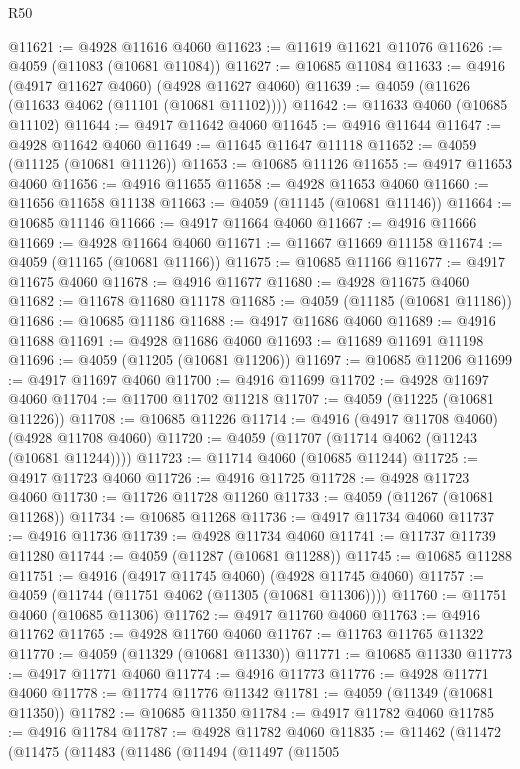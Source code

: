 \begin{lexlean}{R50}
\begin{coremodule}
@11621 := @4928 @11616 @4060
@11623 := @11619 @11621 @11076
@11626 := @4059 (@11083 (@10681 @11084))
@11627 := @10685 @11084
@11633 := @4916 (@4917 @11627 @4060) (@4928 @11627 @4060)
@11639 := @4059 (@11626 (@11633 @4062 (@11101 (@10681 @11102))))
@11642 := @11633 @4060 (@10685 @11102)
@11644 := @4917 @11642 @4060
@11645 := @4916 @11644
@11647 := @4928 @11642 @4060
@11649 := @11645 @11647 @11118
@11652 := @4059 (@11125 (@10681 @11126))
@11653 := @10685 @11126
@11655 := @4917 @11653 @4060
@11656 := @4916 @11655
@11658 := @4928 @11653 @4060
@11660 := @11656 @11658 @11138
@11663 := @4059 (@11145 (@10681 @11146))
@11664 := @10685 @11146
@11666 := @4917 @11664 @4060
@11667 := @4916 @11666
@11669 := @4928 @11664 @4060
@11671 := @11667 @11669 @11158
@11674 := @4059 (@11165 (@10681 @11166))
@11675 := @10685 @11166
@11677 := @4917 @11675 @4060
@11678 := @4916 @11677
@11680 := @4928 @11675 @4060
@11682 := @11678 @11680 @11178
@11685 := @4059 (@11185 (@10681 @11186))
@11686 := @10685 @11186
@11688 := @4917 @11686 @4060
@11689 := @4916 @11688
@11691 := @4928 @11686 @4060
@11693 := @11689 @11691 @11198
@11696 := @4059 (@11205 (@10681 @11206))
@11697 := @10685 @11206
@11699 := @4917 @11697 @4060
@11700 := @4916 @11699
@11702 := @4928 @11697 @4060
@11704 := @11700 @11702 @11218
@11707 := @4059 (@11225 (@10681 @11226))
@11708 := @10685 @11226
@11714 := @4916 (@4917 @11708 @4060) (@4928 @11708 @4060)
@11720 := @4059 (@11707 (@11714 @4062 (@11243 (@10681 @11244))))
@11723 := @11714 @4060 (@10685 @11244)
@11725 := @4917 @11723 @4060
@11726 := @4916 @11725
@11728 := @4928 @11723 @4060
@11730 := @11726 @11728 @11260
@11733 := @4059 (@11267 (@10681 @11268))
@11734 := @10685 @11268
@11736 := @4917 @11734 @4060
@11737 := @4916 @11736
@11739 := @4928 @11734 @4060
@11741 := @11737 @11739 @11280
@11744 := @4059 (@11287 (@10681 @11288))
@11745 := @10685 @11288
@11751 := @4916 (@4917 @11745 @4060) (@4928 @11745 @4060)
@11757 := @4059 (@11744 (@11751 @4062 (@11305 (@10681 @11306))))
@11760 := @11751 @4060 (@10685 @11306)
@11762 := @4917 @11760 @4060
@11763 := @4916 @11762
@11765 := @4928 @11760 @4060
@11767 := @11763 @11765 @11322
@11770 := @4059 (@11329 (@10681 @11330))
@11771 := @10685 @11330
@11773 := @4917 @11771 @4060
@11774 := @4916 @11773
@11776 := @4928 @11771 @4060
@11778 := @11774 @11776 @11342
@11781 := @4059 (@11349 (@10681 @11350))
@11782 := @10685 @11350
@11784 := @4917 @11782 @4060
@11785 := @4916 @11784
@11787 := @4928 @11782 @4060
@11835 := @11462
    (@11472
      (@11475
        (@11483
          (@11486
            (@11494
              (@11497
                (@11505

\end{coremodule}
\end{lexlean}
